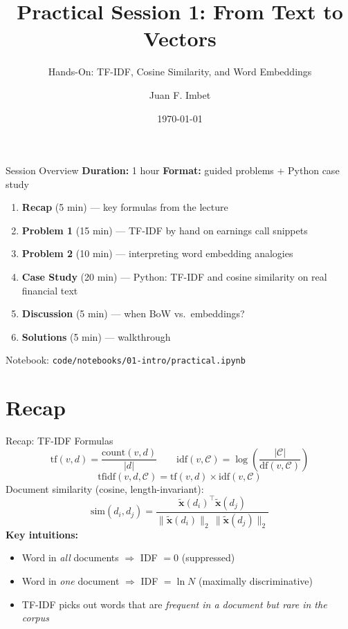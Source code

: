 \documentclass[9pt,t]{beamer}
\title{Practical Session 1: From Text to Vectors}
\subtitle{Hands-On: TF-IDF, Cosine Similarity, and Word Embeddings}
\author{Juan F. Imbet}
\institute{Paris Dauphine -- PSL University}
\date{\today}
\begin{document}
\begin{frame}
  \titlepage
\end{frame}

\begin{frame}{Session Overview}
  \textbf{Duration:} 1 hour \quad \textbf{Format:} guided problems + Python case study
  \medskip
  \begin{enumerate}
    \item \textbf{Recap} (5 min) --- key formulas from the lecture
    \item \textbf{Problem 1} (15 min) --- TF-IDF by hand on earnings call snippets
    \item \textbf{Problem 2} (10 min) --- interpreting word embedding analogies
    \item \textbf{Case Study} (20 min) --- Python: TF-IDF and cosine similarity on real financial text
    \item \textbf{Discussion} (5 min) --- when BoW vs.\ embeddings?
    \item \textbf{Solutions} (5 min) --- walkthrough
  \end{enumerate}
  \medskip
  Notebook: \texttt{code/notebooks/01-intro/practical.ipynb}
\end{frame}

\section{Recap}

\begin{frame}{Recap: TF-IDF Formulas}
  \[
    \mathrm{tf}(v, d) = \frac{\mathrm{count}(v, d)}{|d|}
    \qquad
    \mathrm{idf}(v, \mathcal{C}) = \log\!\left(\frac{|\mathcal{C}|}{\mathrm{df}(v, \mathcal{C})}\right)
  \]
  \[
    \mathrm{tfidf}(v, d, \mathcal{C}) = \mathrm{tf}(v, d) \times \mathrm{idf}(v, \mathcal{C})
  \]
  \medskip
  Document similarity (cosine, length-invariant):
  \[
    \mathrm{sim}(d_i, d_j)
    = \frac{\tilde{\mathbf{x}}(d_i)^\top \tilde{\mathbf{x}}(d_j)}
           {\|\tilde{\mathbf{x}}(d_i)\|_2\,\|\tilde{\mathbf{x}}(d_j)\|_2}
  \]
  \medskip
  \textbf{Key intuitions:}
  \begin{itemize}
    \item Word in \emph{all} documents $\Rightarrow$ IDF $= 0$ (suppressed)
    \item Word in \emph{one} document $\Rightarrow$ IDF $= \ln N$ (maximally discriminative)
    \item TF-IDF picks out words that are \emph{frequent in a document but rare in the corpus}
  \end{itemize}
\end{frame}
\end{document}
